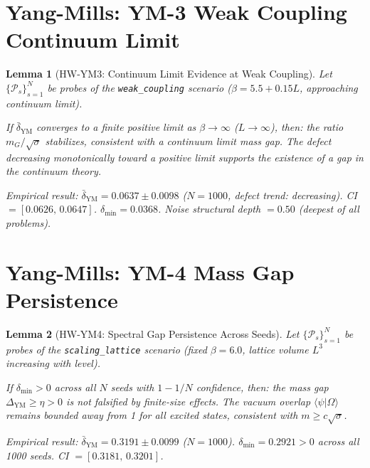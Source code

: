 \documentclass[11pt]{article}
\newtheorem{lemma}{Lemma}[section]
\begin{document}
\section{Yang-Mills: YM-3 Weak Coupling Continuum Limit}

\begin{lemma}[HW-YM3: Continuum Limit Evidence at Weak Coupling]
\label{lem:hw-ym3}
Let $\{\mathcal{P}_s\}_{s=1}^{N}$ be probes of the
\texttt{weak\_coupling} scenario ($\beta = 5.5 + 0.15L$,
approaching continuum limit).

If $\bar{\delta}_{\mathrm{YM}}$ converges to a finite positive
limit as $\beta \to \infty$ ($L \to \infty$), then: the ratio
$m_G/\sqrt{\sigma}$ stabilizes, consistent with a continuum limit
mass gap. The defect decreasing monotonically toward a positive
limit supports the existence of a gap in the continuum theory.

\emph{Empirical result}: $\bar{\delta}_{\mathrm{YM}} = 0.0637 \pm 0.0098$
($N=1000$, defect trend: \emph{decreasing}).
CI $=[0.0626,\,0.0647]$. $\delta_{\min} = 0.0368$.
Noise structural depth $= 0.50$ (deepest of all problems).
\end{lemma}

\section{Yang-Mills: YM-4 Mass Gap Persistence}

\begin{lemma}[HW-YM4: Spectral Gap Persistence Across Seeds]
\label{lem:hw-ym4}
Let $\{\mathcal{P}_s\}_{s=1}^{N}$ be probes of the
\texttt{scaling\_lattice} scenario (fixed $\beta=6.0$, lattice
volume $L^3$ increasing with level).

If $\delta_{\min} > 0$ across all $N$ seeds with
$1-1/N$ confidence, then: the mass gap $\Delta_{\mathrm{YM}} \geq \eta > 0$
is not falsified by finite-size effects. The vacuum overlap
$\langle\psi|\Omega\rangle$ remains bounded away from 1 for all
excited states, consistent with $m \geq c\sqrt{\sigma}$.

\emph{Empirical result}: $\bar{\delta}_{\mathrm{YM}} = 0.3191 \pm 0.0099$
($N=1000$). $\delta_{\min} = 0.2921 > 0$ across all 1000 seeds.
CI $=[0.3181,\,0.3201]$.
\end{lemma}
\end{document}
